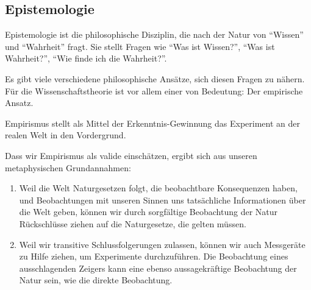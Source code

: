 \subsection{Epistemologie}

Epistemologie ist die philosophische Disziplin, die nach der Natur von \enquote{Wissen} und \enquote{Wahrheit}
fragt. Sie stellt Fragen wie \enquote{Was ist Wissen?}, \enquote{Was ist Wahrheit?},
\enquote{Wie finde ich die Wahrheit?}.

Es gibt viele verschiedene philosophische Ansätze, sich diesen Fragen zu nähern. Für die Wissenschaftstheorie ist vor allem einer von
Bedeutung: Der empirische Ansatz.

Empirismus stellt als Mittel der Erkenntnis-Gewinnung das Experiment an der realen Welt in den Vordergrund.

Dass wir Empirismus als valide einschätzen, ergibt
sich aus unseren metaphysischen Grundannahmen:
\begin{enumerate}
    \item Weil die Welt Naturgesetzen folgt, die beobachtbare Konsequenzen haben,
    und Beobachtungen mit unseren Sinnen uns tatsächliche Informationen über die Welt geben, können wir durch
    sorgfältige Beobachtung der Natur Rückschlüsse ziehen auf die Naturgesetze, die gelten müssen.
    \item Weil wir transitive Schlussfolgerungen zulassen, können wir auch Messgeräte zu Hilfe ziehen, um Experimente durchzuführen. Die Beobachtung eines ausschlagenden Zeigers kann eine ebenso aussagekräftige Beobachtung der Natur sein, wie die direkte Beobachtung.
\end{enumerate}
